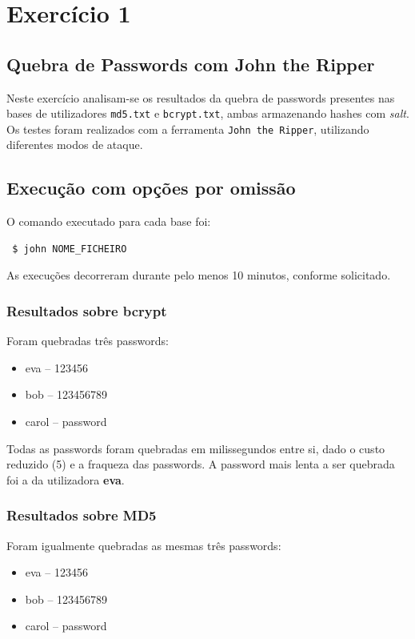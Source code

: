 % 
%  
%
\chapter{Exercício 1}
\label{cha:exercise_1}

\section{Quebra de Passwords com John the Ripper}

Neste exercício analisam-se os resultados da quebra de passwords presentes nas bases de utilizadores \texttt{md5.txt} e \texttt{bcrypt.txt}, ambas armazenando hashes com \textit{salt}. Os testes foram realizados com a ferramenta \texttt{John the Ripper}, utilizando diferentes modos de ataque.

\section{Execução com opções por omissão}

O comando executado para cada base foi: \begin{verbatim} $ john NOME_FICHEIRO \end{verbatim}

As execuções decorreram durante pelo menos 10 minutos, conforme solicitado.

\subsection*{Resultados sobre bcrypt} Foram quebradas três passwords: \begin{itemize} \item eva -- 123456 \item bob -- 123456789 \item carol -- password \end{itemize}

Todas as passwords foram quebradas em milissegundos entre si, dado o custo reduzido (5) e a fraqueza das passwords. A password mais lenta a ser quebrada foi a da utilizadora \textbf{eva}.

\subsection*{Resultados sobre MD5} Foram igualmente quebradas as mesmas três passwords: \begin{itemize} \item eva -- 123456 \item bob -- 123456789 \item carol -- password \end{itemize}

